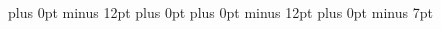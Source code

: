 \documentclass[12pt]{article}
\newcommand{\1}{ {\mathds{1}} }
\begin{document}
	\pagestyle{empty} %

	\def\distEQ{12pt}
	\abovedisplayskip=\distEQ plus 0pt minus \distEQ
	\abovedisplayshortskip=0pt plus 0pt
	\belowdisplayskip=\distEQ plus 0pt minus \distEQ
	\belowdisplayshortskip=7pt plus 0pt minus 7pt
	
	\setlength{\columnsep}{2pt}


	\begin{multicols}{1}
		
		
		\blindmathtrue
		\blindmathpaper
		\blindtext
	\end{multicols}
\end{document}
